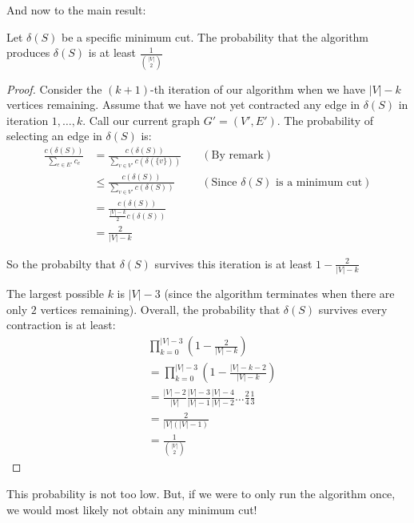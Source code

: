 And now to the main result:
\begin{theorem}{}{}
    Let $\delta(S)$ be a specific minimum cut. The probability that the algorithm produces $\delta(S)$ is at least $\frac{1}{\binom{|V|}{2}}$
\end{theorem}
\begin{proof}
    Consider the $(k + 1)$-th iteration of our algorithm when we have $|V| - k$ vertices remaining. Assume that we have not yet contracted any edge in $\delta(S)$ in iteration $1, \ldots, k$. Call our current graph $G' = (V', E')$. The probability of selecting an edge in $\delta(S)$ is:
    \begin{align*}
        \frac{c(\delta(S))}{\sum_{e \in E'} c_e} &= \frac{c(\delta(S))}{\sum_{v \in V'} c(\delta(\{v\}))} \quad &(\text{By remark})\\
        &\leq \frac{c(\delta(S))}{\sum_{v \in V'} c(\delta(S))} \quad &(\text{Since } \delta(S) \text{ is a minimum cut}) \\
        &= \frac{c(\delta(S))}{\frac{|V| - k}{2}c(\delta(S))} \\
        &= \frac{2}{|V| - k}
    \end{align*}

    So the probabilty that $\delta(S)$ survives this iteration is at least $1 - \frac{2}{|V| - k}$

    The largest possible $k$ is $|V| - 3$ (since the algorithm terminates when there are only $2$ vertices remaining).
    Overall, the probability that $\delta(S)$ survives every contraction is at least:
    \begin{align*}
        &\prod_{k = 0}^{|V| - 3} (1 - \frac{2}{|V| - k}) \\
        &= \prod_{k = 0}^{|V| - 3} (1 - \frac{|V| - k - 2}{|V| - k}) \\
        &= \frac{|V| - 2}{|V|}\frac{|V| - 3}{|V| - 1}\frac{|V| - 4}{|V| - 2}\ldots\frac{2}{4}\frac{1}{3} \\
        &= \frac{2}{|V|(|V| - 1)} \\
        &= \frac{1}{\binom{|V|}{2}}
    \end{align*}
\end{proof}

This probability is not too low. But, if we were to only run the algorithm once, we would most likely not obtain any minimum cut!

